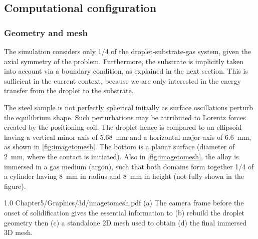\subsection{Computational configuration}

\subsubsection{Geometry and mesh}

The simulation considers only 1/4 of the droplet-substrate-gas system, given the axial symmetry of the problem.
Furthermore, the substrate is implicitly taken into account via a boundary condition, as explained in the next section. 
This is sufficient in the current context, because we are only interested in the energy transfer from the droplet to the substrate. 

The steel sample is not perfectly spherical initially as surface oscillations perturb the equilibrium shape. 
Such perturbations may be attributed to Lorentz forces created by the positioning coil. 
The droplet hence is compared to an ellipsoid having
a vertical minor axis of \SI{5.68}{\milli \metre} and a horizontal major axis of \SI{6.6}{\milli \metre}, as shown in \cref{fig:imagetomesh}.
The bottom is a planar surface (diameter of \SI{2}{\milli \metre}, where the contact is initiated). 
Also in \cref{fig:imagetomesh}, the alloy is immersed in a gas medium (argon), such that both domains form together 1/4 of a 
cylinder having \SI{8}{\milli \metre} in radius and  \SI{8}{\milli \metre} in height (not fully shown in the figure).

\begin{figureth}
{1.0}
{Chapter5/Graphics/3d/imagetomesh.pdf}
{(a) The camera frame before the onset of solidification gives the essential information to (b) 
rebuild the droplet geometry then (c) a standalone 2D mesh used to obtain (d) the final immersed 3D mesh.}
\label{fig:imagetomesh}
\end{figureth}

